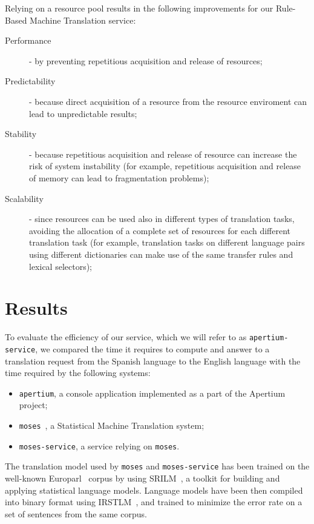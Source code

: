 \documentclass[11pt]{article}
\begin{document}
Relying on a resource pool results in the following improvements for our Rule-Based Machine Translation service:

\begin{description}
 \item[Performance] - by preventing repetitious acquisition and release of resources;
 \item[Predictability] - because direct acquisition of a resource from the resource enviroment can lead to unpredictable results;
 \item[Stability] - because repetitious acquisition and release of resource can increase the risk of system instability (for example, repetitious acquisition and release of memory can lead to fragmentation problems);
 \item[Scalability] - since resources can be used also in different types of translation tasks, avoiding the allocation of a complete set of resources for each different translation task (for example, translation tasks on different language pairs using different dictionaries can make use of the same transfer rules and lexical selectors);
\end{description}


\section{Results}

To evaluate the efficiency of our service, which we will refer to as {\tt apertium-service}, we compared the time it requires to compute and answer to a translation request from the Spanish language to the English language with the time required by the following systems:

\begin{itemize}
 \item {\tt apertium}, a console application implemented as a part of the Apertium project;
 \item {\tt moses}~\citep{moses}, a Statistical Machine Translation system;
 \item {\tt moses-service}, a service relying on {\tt moses}.
\end{itemize}

The translation model used by {\tt moses} and {\tt moses-service} has been trained on the well-known Europarl~\citep{europarl} corpus by using SRILM~\citep{srilm}, a toolkit for building and applying statistical language models. Language models have been then compiled into binary format using IRSTLM~\citep{irstlm}, and trained to minimize the error rate on a set of sentences from the same corpus. 
\end{document}
